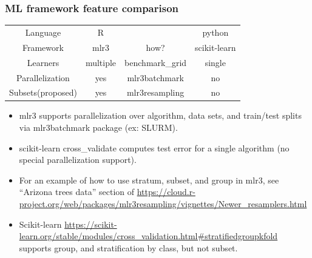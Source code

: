\documentclass[t]{beamer}
\begin{document}
\begin{frame}[fragile]
  \frametitle{ML framework feature comparison}

  \begin{tabular}{cccc}
    Language & R& & python   \\
    Framework & mlr3& how? &  scikit-learn \\
    \hline
    Learners & multiple & benchmark\_grid & single \\
    Parallelization & yes & mlr3batchmark & no   \\
    Subsets(proposed) & yes & mlr3resampling & no  \\
  \end{tabular}

  \begin{itemize}
  \item mlr3 supports parallelization over algorithm, data sets, and
    train/test splits via mlr3batchmark package (ex: SLURM).
  \item scikit-learn cross\_validate computes test error for a single algorithm (no special parallelization support).
  \item
  For an example of how to use stratum, subset, and group in mlr3, see ``Arizona trees data'' section of
  \url{https://cloud.r-project.org/web/packages/mlr3resampling/vignettes/Newer_resamplers.html}
  \item 
  Scikit-learn
  \url{https://scikit-learn.org/stable/modules/cross_validation.html#stratifiedgroupkfold}
  supports group, and stratification by class, but not subset.
  \end{itemize}


  
\end{frame}
\end{document}
